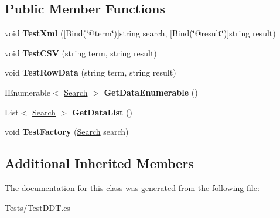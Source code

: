 \subsection*{Public Member Functions}
\begin{DoxyCompactItemize}
\item 
\hypertarget{class_proto_test_1_1_golem_1_1_tests_1_1_test_d_d_t_a2f600cd41fdbd2b5b5ecdd7f1ab27616}{void {\bfseries Test\-Xml} (\mbox{[}Bind(\char`\"{}@term\char`\"{})\mbox{]}string search, \mbox{[}Bind(\char`\"{}@result\char`\"{})\mbox{]}string result)}\label{class_proto_test_1_1_golem_1_1_tests_1_1_test_d_d_t_a2f600cd41fdbd2b5b5ecdd7f1ab27616}

\item 
\hypertarget{class_proto_test_1_1_golem_1_1_tests_1_1_test_d_d_t_a00f32e762707e6c15613c75a6dac9b1b}{void {\bfseries Test\-C\-S\-V} (string term, string result)}\label{class_proto_test_1_1_golem_1_1_tests_1_1_test_d_d_t_a00f32e762707e6c15613c75a6dac9b1b}

\item 
\hypertarget{class_proto_test_1_1_golem_1_1_tests_1_1_test_d_d_t_ac9d49c9b933de5060ca82a82a6c27f3e}{void {\bfseries Test\-Row\-Data} (string term, string result)}\label{class_proto_test_1_1_golem_1_1_tests_1_1_test_d_d_t_ac9d49c9b933de5060ca82a82a6c27f3e}

\item 
\hypertarget{class_proto_test_1_1_golem_1_1_tests_1_1_test_d_d_t_a5b32710559a6968a2fb8b7a2c2410478}{I\-Enumerable$<$ \hyperlink{class_proto_test_1_1_golem_1_1_tests_1_1_test_d_d_t_1_1_search}{Search} $>$ {\bfseries Get\-Data\-Enumerable} ()}\label{class_proto_test_1_1_golem_1_1_tests_1_1_test_d_d_t_a5b32710559a6968a2fb8b7a2c2410478}

\item 
\hypertarget{class_proto_test_1_1_golem_1_1_tests_1_1_test_d_d_t_a1a3ef9a2b36334f9d5b796d215725ef0}{List$<$ \hyperlink{class_proto_test_1_1_golem_1_1_tests_1_1_test_d_d_t_1_1_search}{Search} $>$ {\bfseries Get\-Data\-List} ()}\label{class_proto_test_1_1_golem_1_1_tests_1_1_test_d_d_t_a1a3ef9a2b36334f9d5b796d215725ef0}

\item 
\hypertarget{class_proto_test_1_1_golem_1_1_tests_1_1_test_d_d_t_a3fd500261f6616af0209810cfdb19ad8}{void {\bfseries Test\-Factory} (\hyperlink{class_proto_test_1_1_golem_1_1_tests_1_1_test_d_d_t_1_1_search}{Search} search)}\label{class_proto_test_1_1_golem_1_1_tests_1_1_test_d_d_t_a3fd500261f6616af0209810cfdb19ad8}

\end{DoxyCompactItemize}
\subsection*{Additional Inherited Members}


The documentation for this class was generated from the following file\-:\begin{DoxyCompactItemize}
\item 
Tests/Test\-D\-D\-T.\-cs\end{DoxyCompactItemize}
